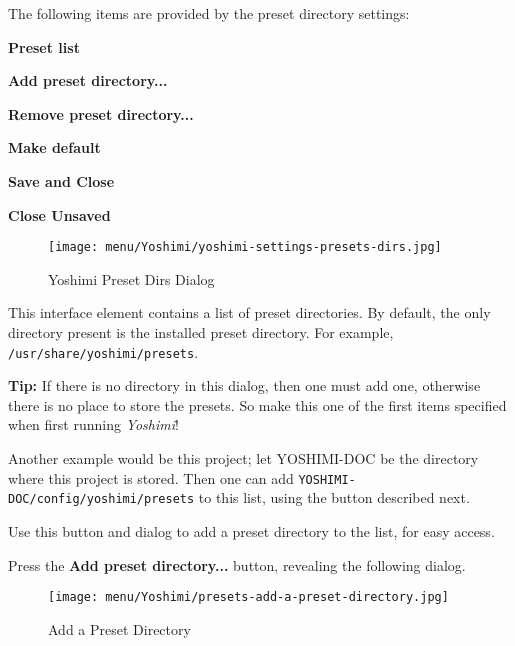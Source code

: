    The following items are provided by the preset directory settings:

   \begin{enumber}
      \item \textbf{Preset list}
      \item \textbf{Add preset directory...}
      \item \textbf{Remove preset directory...}
      \item \textbf{Make default}
      \item \textbf{Save and Close}
      \item \textbf{Close Unsaved}
   \end{enumber}

\begin{figure}[H]
   \centering 
   \texttt{[image: menu/Yoshimi/yoshimi-settings-presets-dirs.jpg]}
   \caption[Preset Dirs Tab]{Yoshimi Preset Dirs Dialog}
   \label{fig:yoshimi_presets_dirs_tab}
\end{figure}

   \setcounter{ItemCounter}{0}      %

   This interface element contains a list of preset directories.
   By default, the only directory present is the installed preset directory.
   For example, \texttt{/usr/share/yoshimi/presets}.
   
   \textbf{Tip:}
   If there is no directory in this dialog, then one must
   add one, otherwise there is no place to store the presets.
   So make this one of the first items specified when first running
   \textsl{Yoshimi}!

   Another example would be this project; let YOSHIMI-DOC be the directory
   where this project is stored.  Then one can add
   \texttt{YOSHIMI-DOC/config/yoshimi/presets} to this list, using the
   button described next.

   Use this button and dialog to add a preset directory to the list, for
   easy access.

   Press the \textbf{Add preset directory...} button, revealing the
   following dialog.

\begin{figure}[H]
   \centering 
   \texttt{[image: menu/Yoshimi/presets-add-a-preset-directory.jpg]}
   \caption[Add Preset Directory]{Add a Preset Directory}
   \label{fig:presets_add_a_preset_directory}
\end{figure}

